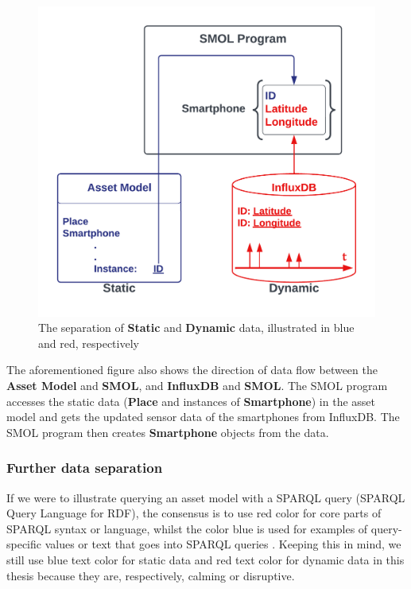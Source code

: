 \documentclass{article}
\begin{document}
\begin{figure}[H]
    \centering
    \includegraphics[scale=0.22]{graphics/static_dynamic_asset_model.png}
    \caption{The separation of \textbf{Static} and \textbf{Dynamic} data, illustrated in blue and red, respectively}
    \label{fig:static_dynamic_asset_model}
\end{figure}

The aforementioned figure also shows the direction of data flow between the \textbf{Asset Model} and \textbf{SMOL}, and \textbf{InfluxDB} and \textbf{SMOL}. The SMOL program accesses the static data (\textbf{Place} and instances of \textbf{Smartphone}) in the asset model and gets the updated sensor data of the smartphones from InfluxDB. The SMOL program then creates \textbf{Smartphone} objects from the data.


\subsubsection{Further data separation}\label{subsubsec:FurtherDataSeparation}
If we were to illustrate querying an asset model with a SPARQL query (SPARQL Query Language for RDF), the consensus is to use red color for core parts of SPARQL syntax or language, whilst the color blue is used for examples of query-specific values or text that goes into SPARQL queries \cite{noauthor_sparql_nodate}. Keeping this in mind, we still use blue text color for static data and red text color for dynamic data in this thesis because they are, respectively, calming or disruptive. 
\end{document}
